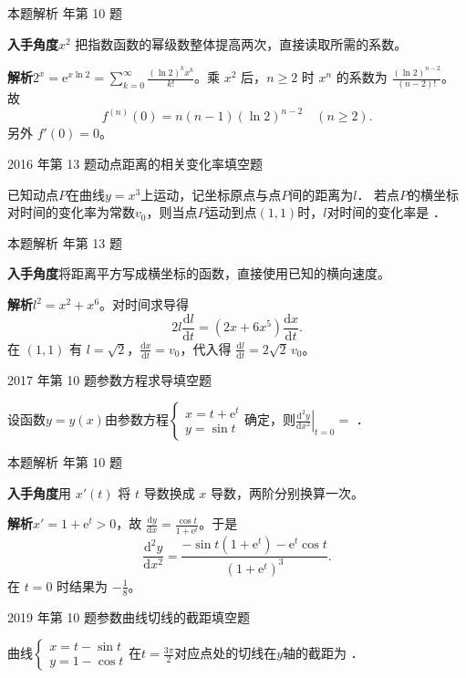 \documentclass[UTF8,zihao=-4,fontset=fandol]{ctexart}
\newcommand{\blank}{\underline{\hspace{5em}}}
\newcommand{\QuestionPage}[6]{%
  \par\noindent\begin{minipage}{\linewidth}
  \raggedright
  {\small\textcolor{black!60}{#3\quad #5}\hfill\textcolor{accent}{#2}}\par\smallskip}
\newcommand{\QuestionEnd}{\end{minipage}\par\medskip}
\newcommand{\QuestionPage}[6]{%
  \clearpage
  {\small\textcolor{accent}{#1\hfill #2}}\par\medskip
  {\small\textcolor{black!60}{#3\quad #5\hfill #6}}\par\vspace{9bp}}
\newcommand{\QuestionEnd}{}
\newenvironment{QuestionSolution}[1]{%
  \clearpage
  {\small\textcolor{black!60}{本题解析\quad #1}}\par\medskip
}{\par\clearpage}
\begin{document}
\begin{QuestionSolution}{2015 年第 10 题}
\textbf{入手角度}\quad \(x^2\) 把指数函数的幂级数整体提高两次，直接读取所需的系数。

\textbf{解析}\quad \(2^x=\mathrm{e}^{x\ln2}=\sum_{k=0}^{\infty}\frac{(\ln2)^k x^k}{k!}\)。乘 \(x^2\) 后，\(n\ge2\) 时 \(x^n\) 的系数为 \(\frac{(\ln2)^{n-2}}{(n-2)!}\)。故
\[
\boxed{f^{(n)}(0)=n(n-1)(\ln2)^{n-2}\quad(n\ge2)}.
\]
另外 \(f'(0)=0\)。
\end{QuestionSolution}

\QuestionPage{2.2 求导的基本法则}{填空题}{2016 年第 13 题}{2}{动点距离的相关变化率}{072 / 234}
已知动点$P$在曲线$y = x^3$上运动，记坐标原点与点$P$间的距离为$l$．
若点$P$的横坐标对时间的变化率为常数$v_0$，则当点$P$运动到点$(1,1)$时，$l$对时间的变化率是 \blank{}．
\QuestionEnd

\begin{QuestionSolution}{2016 年第 13 题}
\textbf{入手角度}\quad 将距离平方写成横坐标的函数，直接使用已知的横向速度。

\textbf{解析}\quad \(l^2=x^2+x^6\)。对时间求导得
\[
2l\frac{\mathrm{d}l}{\mathrm{d}t}=(2x+6x^5)\frac{\mathrm{d}x}{\mathrm{d}t}.
\]
在 \((1,1)\) 有 \(l=\sqrt2\)，\(\frac{\mathrm{d}x}{\mathrm{d}t}=v_0\)，代入得 \(\boxed{\frac{\mathrm{d}l}{\mathrm{d}t}=2\sqrt2\,v_0}\)。
\end{QuestionSolution}

\QuestionPage{2.2 求导的基本法则}{填空题}{2017 年第 10 题}{2}{参数方程求导}{073 / 234}
设函数$y = y(x)$由参数方程$\begin{cases}
  x = t + \mathrm{e}^t \\
  y = \sin t
\end{cases}$确定，则$\left.\frac{\mathrm{d}^2y}{\mathrm{d} x^2}\right|_{t=0} =$ \blank{}．
\QuestionEnd

\begin{QuestionSolution}{2017 年第 10 题}
\textbf{入手角度}\quad 用 \(x'(t)\) 将 \(t\) 导数换成 \(x\) 导数，两阶分别换算一次。

\textbf{解析}\quad \(x'=1+\mathrm{e}^t>0\)，故 \(\frac{\mathrm{d}y}{\mathrm{d}x}=\frac{\cos t}{1+\mathrm{e}^t}\)。于是
\[
\frac{\mathrm{d}^2y}{\mathrm{d}x^2}
=\frac{-\sin t(1+\mathrm{e}^t)-\mathrm{e}^t\cos t}{(1+\mathrm{e}^t)^3}.
\]
在 \(t=0\) 时结果为 \(\boxed{-\frac{1}{8}}\)。
\end{QuestionSolution}

\QuestionPage{2.2 求导的基本法则}{填空题}{2019 年第 10 题}{1}{参数曲线切线的截距}{074 / 234}
曲线$\begin{cases}
  x = t - \sin t \\
  y = 1 - \cos t
\end{cases}$在$t = \frac{3\pi}{2}$对应点处的切线在$y$轴的截距为 \blank{}．
\QuestionEnd
\end{document}
